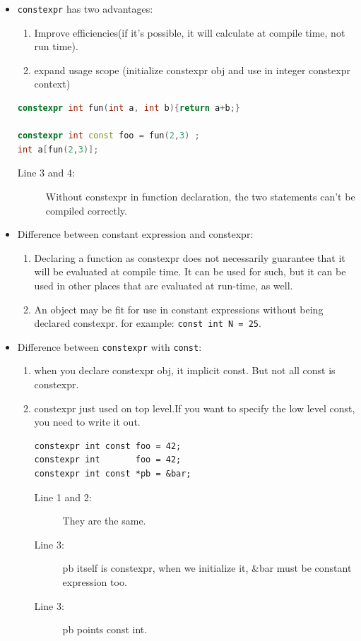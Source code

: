 \documentclass[a4paper,11pt,twoside]{book}
\begin{document}
\begin{itemize}
	\item \texttt{constexpr} has two advantages:
\begin{enumerate}
	\item Improve efficiencies(if it's possible, it will calculate at compile time, not run time). 
	
	\item expand usage scope (initialize constexpr obj and use in integer constexpr context)
\end{enumerate}
\begin{lstlisting}[frame=single, language=c++]
constexpr int fun(int a, int b){return a+b;}

constexpr int const foo = fun(2,3) ; 
int a[fun(2,3)];
\end{lstlisting}
\begin{description}
	\item[Line 3 and 4:] Without constexpr in function declaration, the two statements can't be compiled correctly.
\end{description}

	\item Difference between constant expression and constexpr:
	\begin{enumerate}
		\item Declaring a function as constexpr does not necessarily guarantee that it will be evaluated at compile time. It can be used for such, but it can be used in other places that are evaluated at run-time, as well.
		
		\item An object may be fit for use in constant expressions without being declared constexpr. for example: \texttt{const int N = 25}.
	\end{enumerate}

	\item Difference between \texttt{constexpr} with \texttt{const}:
	\begin{enumerate}
		\item when you declare constexpr obj, it implicit const. But not all const is constexpr.
		
		\item constexpr just used on top level.If you want to specify the low level const, you need to write it out.
\begin{lstlisting}
constexpr int const foo = 42;
constexpr int       foo = 42; 
constexpr int const *pb = &bar; 
\end{lstlisting}
	\begin{description}
		\item[Line 1 and 2:] They are the same.
		\item[Line 3:] pb itself is constexpr, when we initialize it, \&bar must be constant expression too.
		\item[Line 3:] pb points const int.
	\end{description}
	\end{enumerate}


\end{itemize}
\end{document}
